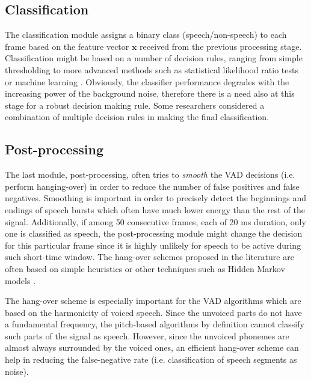 \subsection{Classification}

The classification module assigns a binary class (speech/non-speech) to each frame based on the feature vector $\mathbf{x}$ received from the previous processing stage. Classification might be based on a number of decision rules, ranging from simple thresholding \cite{G729} to more advanced methods such as statistical likelihood ratio tests \cite{Sohn, ImprovedLikelihood, SohnInitial} or machine learning \cite{XiaoLei, Stadtschnitzer}. Obviously, the classifier performance degrades with the increasing power of the background noise, therefore there is a need also at this stage for a robust decision making rule. Some researchers \cite{Kida} considered a combination of multiple decision rules in making the final classification.

\subsection{Post-processing}

The last module, post-processing, often tries to \emph{smooth} the VAD decisions (i.e. perform hanging-over) in order to reduce the number of false positives and false negatives. Smoothing is important in order to precisely detect the beginnings and endings of speech bursts which often have much lower energy than the rest of the signal. Additionally, if among 50 consecutive frames, each of 20 ms duration, only one is classified as speech, the post-processing module might change the decision for this particular frame since it is highly unlikely for speech to be active during such short-time window. The hang-over schemes  proposed in the literature are often based on simple heuristics \cite{G729} or other techniques such as Hidden Markov models \cite{Sohn}.

The hang-over scheme is especially important for the VAD algorithms which are based on the harmonicity of voiced speech. Since the unvoiced parts do not have a fundamental frequency, the pitch-based algorithms by definition cannot classify such parts of the signal as speech. However, since the unvoiced phonemes are almost always surrounded by the voiced ones, an efficient hang-over scheme can help in reducing the false-negative rate (i.e. classification of speech segments as noise).


